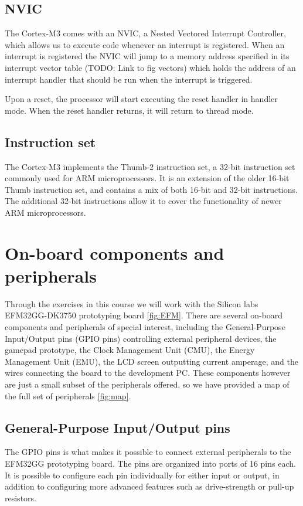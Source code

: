 \subsection{NVIC}
The Cortex-M3 comes with an NVIC, a Nested Vectored Interrupt Controller, which allows us to execute code whenever an interrupt is registered. When an interrupt is registered the NVIC will jump to a memory address specified in its interrupt vector table (TODO: Link to fig vectors) which holds the address of an interrupt handler that should be run when the interrupt is triggered.\cite{compendium}

Upon a reset, the processor will start executing the reset handler in handler mode. When the reset handler returns, it will return to thread mode.


\subsection{Instruction set}
The Cortex-M3 implements the Thumb-2 instruction set, a 32-bit instruction set commonly used for ARM microprocessors. It is an extension of the older 16-bit Thumb instruction set, and contains a mix of both 16-bit and 32-bit instructions. The additional 32-bit instructions allow it to cover the functionality of newer ARM microprocessors.\cite{CortexA8-RM}



\section{On-board components and peripherals}

Through the exercises in this course we will work with the  Silicon labs EFM32GG-DK3750 prototyping board \ref{fig:EFM}. There are several on-board components and peripherals of special interest, including the General-Purpose Input/Output pins (GPIO pins) controlling external peripheral devices, the gamepad prototype, the Clock Management Unit (CMU), the Energy Management Unit (EMU), the LCD screen outputting current amperage, and the wires connecting the board to the development PC. These components however are just a small subset of the peripherals offered, so we have provided a map of the full set of peripherals \ref{fig:map}.

\subsection{General-Purpose Input/Output pins}
The GPIO pins is what makes it possible to connect external peripherals to the EFM32GG prototyping board. The pins are organized into ports of 16 pins each. It is possible to configure each pin individually for either input or output, in addition to configuring more advanced features such as drive-strength or pull-up resistors.

